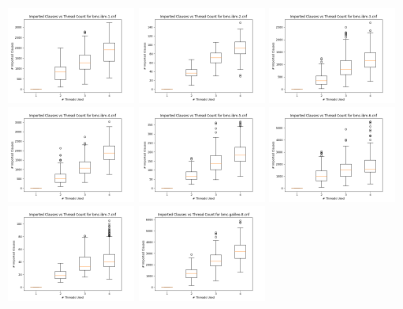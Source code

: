 \documentclass[11pt]{extarticle}
\begin{document}
\noindent
\includegraphics[width=0.25\textwidth]{figures/bmc-ibm-1imp.png}
\includegraphics[width=0.25\textwidth]{figures/bmc-ibm-2imp.png}
\includegraphics[width=0.25\textwidth]{figures/bmc-ibm-3imp.png}
\includegraphics[width=0.25\textwidth]{figures/bmc-ibm-4imp.png}
\includegraphics[width=0.25\textwidth]{figures/bmc-ibm-5imp.png}
\includegraphics[width=0.25\textwidth]{figures/bmc-ibm-6imp.png}
\includegraphics[width=0.25\textwidth]{figures/bmc-ibm-7imp.png}
\includegraphics[width=0.25\textwidth]{figures/bmc-galileo-8imp.png}
\end{document}
